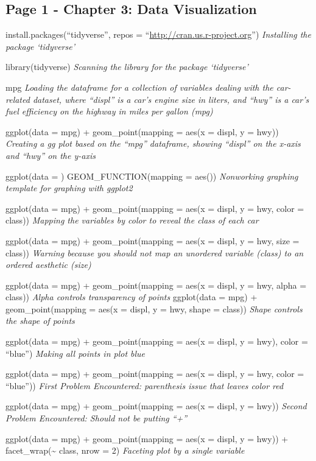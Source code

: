 \documentclass[
]{article}
\begin{document}
\hypertarget{page-1---chapter-3-data-visualization}{%
\subsection{Page 1 - Chapter 3: Data
Visualization}\label{page-1---chapter-3-data-visualization}}

install.packages(``tidyverse'', repos =
``\url{http://cran.us.r-project.org}'') \emph{Installing the package
`tidyverse'}

library(tidyverse) \emph{Scanning the library for the package
`tidyverse'}

mpg \emph{Loading the dataframe for a collection of variables dealing
with the car-related dataset, where ``displ'' is a car's engine size in
liters, and ``hwy'' is a car's fuel efficiency on the highway in miles
per gallon (mpg)}

ggplot(data = mpg) + geom\_point(mapping = aes(x = displ, y = hwy))
\emph{Creating a gg plot based on the ``mpg'' dataframe, showing
``displ'' on the x-axis and ``hwy'' on the y-axis}

ggplot(data = ) GEOM\_FUNCTION(mapping = aes()) \emph{Nonworking
graphing template for graphing with ggplot2}

ggplot(data = mpg) + geom\_point(mapping = aes(x = displ, y = hwy, color
= class)) \emph{Mapping the variables by color to reveal the class of
each car}

ggplot(data = mpg) + geom\_point(mapping = aes(x = displ, y = hwy, size
= class)) \emph{Warning because you should not map an unordered variable
(class) to an ordered aesthetic (size)}

ggplot(data = mpg) + geom\_point(mapping = aes(x = displ, y = hwy, alpha
= class)) \emph{Alpha controls transparency of points} ggplot(data =
mpg) + geom\_point(mapping = aes(x = displ, y = hwy, shape = class))
\emph{Shape controls the shape of points}

ggplot(data = mpg) + geom\_point(mapping = aes(x = displ, y = hwy),
color = ``blue'') \emph{Making all points in plot blue}

ggplot(data = mpg) + geom\_point(mapping = aes(x = displ, y = hwy, color
= ``blue'')) \emph{First Problem Encountered: parenthesis issue that
leaves color red}

ggplot(data = mpg) + geom\_point(mapping = aes(x = displ, y = hwy))
\emph{Second Problem Encountered: Should not be putting ``+''}

ggplot(data = mpg) + geom\_point(mapping = aes(x = displ, y = hwy)) +
facet\_wrap(\textasciitilde{} class, nrow = 2) \emph{Faceting plot by a
single variable}
\end{document}
